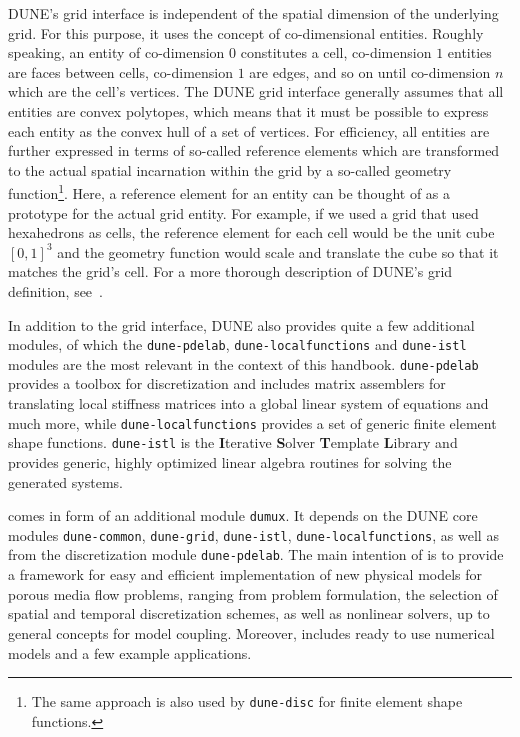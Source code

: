 DUNE's grid interface is independent of the spatial dimension of the
underlying grid. For this purpose, it uses the concept of
co-dimensional entities. Roughly speaking, an entity of co-dimension
$0$ constitutes a cell, co-dimension $1$ entities are faces between
cells, co-dimension $1$ are edges, and so on until co-dimension $n$
which are the cell's vertices.  The DUNE grid interface generally
assumes that all entities are convex polytopes, which means that it
must be possible to express each entity as the convex hull of a set of
vertices. For efficiency, all entities are further expressed in terms
of so-called reference elements which are transformed to the actual
spatial incarnation within the grid by a so-called geometry
function\footnote{The same approach is also used by \texttt{dune-disc} for
  finite element shape functions.}. Here, a reference element for an
entity can be thought of as a prototype for the actual grid
entity. For example, if we used a grid that used hexahedrons as cells,
the reference element for each cell would be the unit cube $[0, 1]^3$
and the geometry function would scale and translate the cube so that
it matches the grid's cell. For a more thorough description of DUNE's
grid definition, see~\cite{BASTIAN2008}.

In addition to the grid interface, DUNE also provides quite a few
additional modules, of which the \texttt{dune-pdelab},
\texttt{dune-localfunctions} and \texttt{dune-istl} modules are the
most relevant in the context of this handbook.  \texttt{dune-pdelab}
provides a toolbox for discretization and includes matrix assemblers
for translating local stiffness matrices into a global linear system
of equations and much more, while \texttt{dune-localfunctions}
provides a set of generic finite element shape
functions. \texttt{dune-istl} is the \textbf{I}terative
\textbf{S}olver \textbf{T}emplate \textbf{L}ibrary and provides
generic, highly optimized linear algebra routines for solving the
generated systems.

\Dumux comes in form of an additional module \texttt{dumux}. 
It depends on the DUNE core modules 
\texttt{dune-common}, \texttt{dune-grid}, \texttt{dune-istl}, \texttt{dune-localfunctions}, as well as from 
the discretization module \texttt{dune-pdelab}. 
The main intention of \Dumux is to provide a framework for easy and efficient 
implementation of new physical models for porous media flow problems, 
ranging from problem formulation, the selection of 
spatial and temporal discretization schemes, as well as nonlinear solvers,  
up to general concepts for model coupling.  
Moreover, \Dumux includes ready to use numerical models and a few example applications. 

